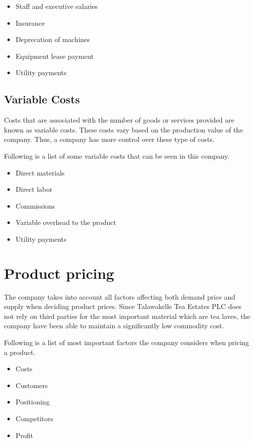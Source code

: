 \documentclass[12pt]{report}
\begin{document}
\begin{itemize}
	\item {Staff and executive salaries}
	\item {Insurance}
	\item {Deprecation of machines}
	\item {Equipment lease payment}
	\item {Utility payments}
\end{itemize}

\section{Variable Costs}
Costs that are associated with the number of goods or services provided are known as variable costs. These costs vary based on the production value of the company. Thus, a company has more control over these type of costs.


Following is a list of some variable costs that can be seen in this company.

\begin{itemize}
	\item {Direct materials}
	\item {Direct labor}
	\item {Commissions}
	\item {Variable overhead to the product}
	\item {Utility payments}
\end{itemize}


\chapter{Product pricing}
The company takes into account all factors affecting both demand price and supply when deciding product prices. Since Talawakelle Tea Estates PLC does not rely on third parties for the most important material which are tea laves, the company have been able to maintain a significantly low commodity cost.

Following is a list of most important factors the company considers when pricing a product.

\begin{itemize}
	\item {Costs}
	\item {Customers}
	\item {Positioning}
	\item {Competitors}
	\item {Profit}
\end{itemize}
\end{document}
